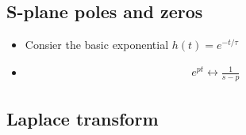 \subsection*{S-plane poles and zeros}
\begin{itemize}
\item{Consier the basic exponential $h(t) = e^{-t/\tau}$}
\item{
\begin{align*}
e^{pt} \leftrightarrow \frac{1}{s - p}
\end{align*}
}
\end{itemize}

% 
% 

\subsection*{Laplace transform}
% 
% 
% 
% 



